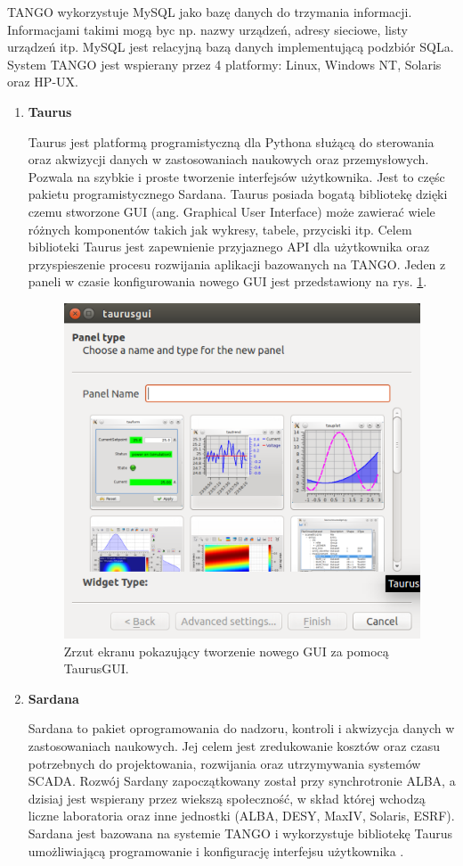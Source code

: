 \begin{enumerate}
	\hspace{2em}TANGO wykorzystuje MySQL jako bazę danych do trzymania informacji. Informacjami takimi mogą byc np. nazwy urządzeń, adresy sieciowe, listy urządzeń itp. MySQL jest relacyjną bazą danych implementującą podzbiór SQLa. System TANGO jest wspierany przez 4 platformy: Linux, Windows NT, Solaris oraz HP-UX.
	
	\begin{enumerate}
		\item \textbf{Taurus}
		
		\hspace{2em}Taurus jest platformą programistyczną dla Pythona służącą do sterowania oraz akwizycji danych w zastosowaniach naukowych oraz przemysłowych. Pozwala na szybkie i proste tworzenie interfejsów użytkownika. Jest to częśc pakietu programistycznego Sardana. Taurus posiada bogatą bibliotekę dzięki czemu stworzone GUI (ang. Graphical User Interface)  może zawierać wiele różnych komponentów takich jak wykresy, tabele, przyciski itp. Celem biblioteki Taurus jest zapewnienie przyjaznego API dla użytkownika oraz przyspieszenie procesu rozwijania aplikacji bazowanych na TANGO. Jeden z paneli w czasie konfigurowania nowego GUI jest przedstawiony na rys. \ref{fig:taurusgui}.
		
		\begin{figure}[pth]
			\centering
			\includegraphics[width=0.6\linewidth]{Grafika/taurusgui}
			\caption{Zrzut ekranu pokazujący tworzenie nowego GUI za pomocą TaurusGUI.}
			\label{fig:taurusgui}
		\end{figure}
				
		
		\item \textbf{Sardana}
		
		\hspace{2em}Sardana to pakiet oprogramowania do nadzoru, kontroli i akwizycja danych w zastosowaniach naukowych. Jej celem jest zredukowanie kosztów oraz czasu potrzebnych do projektowania, rozwijania oraz utrzymywania systemów SCADA. Rozwój Sardany zapoczątkowany został przy synchrotronie ALBA, a dzisiaj jest wspierany przez wiekszą społeczność,  w skład której wchodzą liczne laboratoria oraz inne jednostki (ALBA, DESY, MaxIV, Solaris, ESRF).
		Sardana jest bazowana na systemie TANGO i wykorzystuje bibliotekę Taurus umożliwiającą programowanie i konfigurację interfejsu użytkownika \cite{Sardana}.
		

\end{enumerate}
\end{enumerate}
